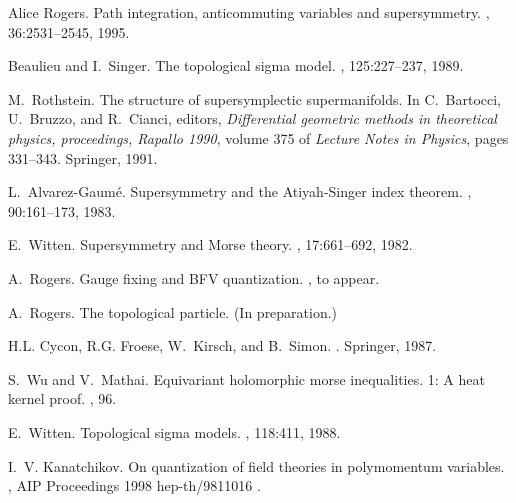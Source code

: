\documentclass[a4paper,fleqn,12pt]{article}
\begin{document}
\begin{thebibliography}{9}
Alice Rogers.
\newblock Path integration, anticommuting variables and supersymmetry.
, 36:2531--2545, 1995.

Beaulieu and I.~Singer.
\newblock The topological sigma model.
, 125:227--237, 1989.

M.~Rothstein.
\newblock The structure of supersymplectic supermanifolds.
\newblock In C.~Bartocci, U.~Bruzzo, and R.~Cianci, editors, {\em Differential
  geometric methods in theoretical physics, proceedings, Rapallo 1990}, volume
  375 of {\em Lecture Notes in Physics}, pages 331--343. Springer, 1991.

L.~Alvarez-Gaum\'e.
\newblock Supersymmetry and the {A}tiyah-{S}inger index theorem.
, 90:161--173, 1983.

E.~Witten.
\newblock Supersymmetry and {M}orse theory.
, 17:661--692, 1982.

A.~Rogers.
\newblock Gauge fixing and {BFV} quantization.
, \newblock to appear.

A.~Rogers.
\newblock The topological particle. \newblock (In preparation.)

H.L. Cycon, R.G. Froese, W.~Kirsch, and B.~Simon.
.
\newblock Springer, 1987.

S.~Wu and V.~Mathai.
\newblock Equivariant holomorphic morse inequalities. 1: A heat kernel proof.
, 96.

E.~Witten.
\newblock Topological sigma models.
, 118:411, 1988.

I.~V. Kanatchikov.
\newblock On quantization of field theories in polymomentum variables.
,
  \newblock AIP Proceedings 1998 \newblock hep-th/9811016 .

\end{thebibliography}
\end{document}
